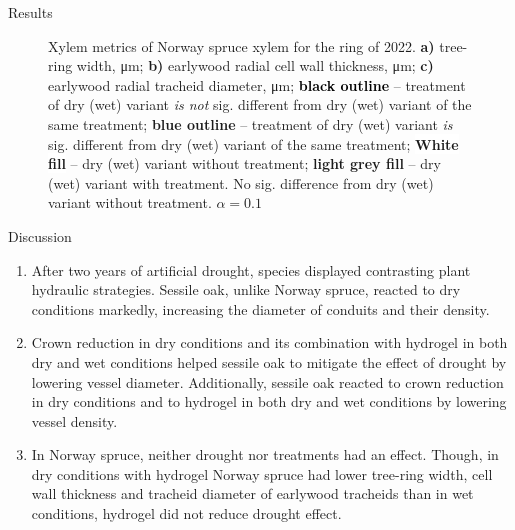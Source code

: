 \documentclass[final]{beamer}
\newlength{\colwidth}
\begin{document}
\begin{frame}[t]
\begin{columns}[t]
\begin{column}{\colwidth}
\begin{block}{Results}
\begin{figure}
    
    \caption{
        Xylem metrics of Norway spruce xylem for the ring of 2022.
        \textbf{a)} tree-ring width, \si{\micro\meter};
        \textbf{b)} earlywood radial cell wall thickness, \si{\micro\meter};
        \textbf{c)} earlywood radial tracheid diameter, \si{\micro\meter};
        \textbf{\textcolor{black}{black outline}} -- treatment of dry (wet) variant \emph{is not} sig. different from dry (wet) variant of the same treatment;
        \textbf{\textcolor[RGB]{31,120,180}{blue outline}} -- treatment of dry (wet) variant \emph{is} sig. different from dry (wet) variant of the same treatment;
        \textbf{\colorbox{white}{White fill}} -- dry (wet) variant without treatment;
        \textbf{\colorbox{gray!10}{light grey fill}} -- dry (wet) variant with treatment. No sig. difference from dry (wet) variant without treatment.
        $\alpha = 0.1$
    }
    \label{fig:spruce_box}
\end{figure}
\end{block}

\begin{block}{Discussion}
\setlength{\columnsep}{20pt}
\begin{multicols}{2}
    \begin{enumerate}
        \item After two years of artificial drought, species displayed contrasting plant hydraulic strategies. Sessile oak, unlike Norway spruce, reacted to dry conditions markedly, increasing the diameter of conduits and their density.
        \item Crown reduction in dry conditions and its combination with hydrogel in both dry and wet conditions helped sessile oak to mitigate the effect of drought by lowering vessel diameter. Additionally, sessile oak reacted to crown reduction in dry conditions and to hydrogel in both dry and wet conditions by lowering vessel density.
        \item In Norway spruce, neither drought nor treatments had an effect. Though, in dry conditions with hydrogel Norway spruce had lower tree-ring width, cell wall thickness and tracheid diameter of earlywood tracheids than in wet conditions, hydrogel did not reduce drought effect.
    \end{enumerate}
\end{multicols}
\end{block}


\end{column}
\end{columns}
\end{frame}
\end{document}
